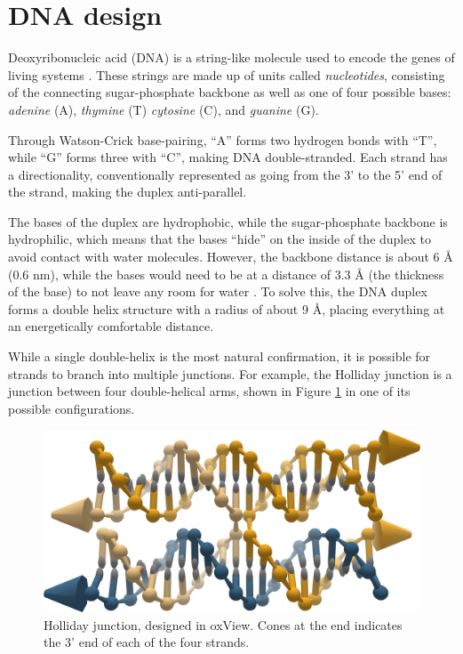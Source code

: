 

\section{DNA design}
Deoxyribonucleic acid (DNA) is a string-like molecule used to encode the genes of living systems \cite{calladine1997understanding}. These strings are made up of units called \emph{nucleotides}, consisting of the connecting sugar-phosphate backbone as well as one of four possible bases: \emph{adenine} (A), \emph{thymine} (T) \emph{cytosine} (C), and \emph{guanine} (G).

Through Watson-Crick base-pairing, ``A'' forms two hydrogen bonds with ``T'', while ``G'' forms three with ``C'', making DNA double-stranded. Each strand has a directionality, conventionally represented as going from the 3' to the 5' end of the strand, making the duplex anti-parallel.

The bases of the duplex are hydrophobic, while the sugar-phosphate backbone is hydrophilic, which means that the bases ``hide'' on the inside of the duplex to avoid contact with water molecules. However, the backbone distance is about 6 Å (0.6 nm), while the bases would need to be at a distance of 3.3 Å (the thickness of the base) to not leave any room for water \cite{calladine1997understanding}. To solve this, the DNA duplex forms a double helix structure with a radius of about 9 Å, placing everything at an energetically comfortable distance.

While a single double-helix is the most natural confirmation, it is possible for strands to branch into multiple junctions. For example, the Holliday junction is a junction between four double-helical arms, shown in Figure \ref{fig:holliday} in one of its possible configurations.

\begin{figure}
    \centering\includegraphics[width=\textwidth]{figures/holliday.png}
    \caption{Holliday junction, designed in oxView. Cones at the end indicates the 3' end of each of the four strands.}
    \label{fig:holliday}
\end{figure}

